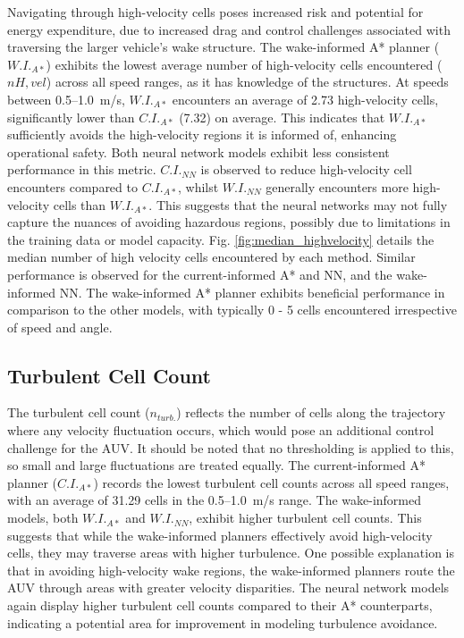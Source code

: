 \documentclass[final,5p,times,twocolumn]{elsarticle}
\begin{document}
Navigating through high-velocity cells poses increased risk and potential for energy expenditure, due to increased drag and control challenges associated with traversing the larger vehicle's wake structure. The wake-informed A* planner ($W.I._{A*}$) exhibits the lowest average number of high-velocity cells encountered ($n{H,vel}$) across all speed ranges, as it has knowledge of the structures. At speeds between 0.5--1.0~m/s, $W.I._{A*}$ encounters an average of 2.73 high-velocity cells, significantly lower than $C.I._{A*}$ (7.32) on average. This indicates that $W.I._{A*}$ sufficiently avoids the high-velocity regions it is informed of, enhancing operational safety. Both neural network models exhibit less consistent performance in this metric. $C.I._{NN}$ is observed to reduce high-velocity cell encounters compared to $C.I._{A*}$, whilst $W.I._{NN}$ generally encounters more high-velocity cells than $W.I._{A*}$. This suggests that the neural networks may not fully capture the nuances of avoiding hazardous regions, possibly due to limitations in the training data or model capacity. Fig. \ref{fig:median_highvelocity} details the median number of high velocity cells encountered by each method. Similar performance is observed for the current-informed A* and NN, and the wake-informed NN. The wake-informed A* planner exhibits beneficial performance in comparison to the other models, with typically 0 - 5 cells encountered irrespective of speed and angle. 

\subsection{Turbulent Cell Count} %

The turbulent cell count ($n_{turb.}$) reflects the number of cells along the trajectory where any velocity fluctuation occurs, which would pose an additional control challenge for the AUV. It should be noted that no thresholding is applied to this, so small and large fluctuations are treated equally. The current-informed A* planner ($C.I._{A*}$) records the lowest turbulent cell counts across all speed ranges, with an average of 31.29 cells in the 0.5--1.0~m/s range. The wake-informed models, both $W.I._{A*}$ and $W.I._{NN}$, exhibit higher turbulent cell counts. This suggests that while the wake-informed planners effectively avoid high-velocity cells, they may traverse areas with higher turbulence. One possible explanation is that in avoiding high-velocity wake regions, the wake-informed planners route the AUV through areas with greater velocity disparities. The neural network models again display higher turbulent cell counts compared to their A* counterparts, indicating a potential area for improvement in modeling turbulence avoidance.
\end{document}
